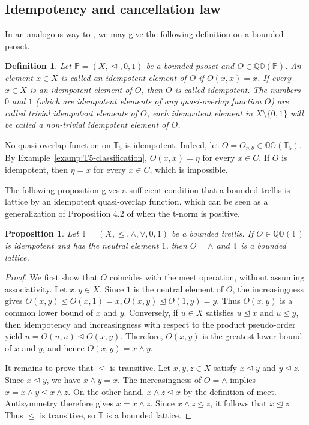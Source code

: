 \documentclass[preprint,12pt]{elsarticle}
\newtheorem{proposition}[theorem]{Proposition}
\newtheorem{definition}[theorem]{Definition}
\begin{document}
\subsection{Idempotency and cancellation law}

In an analogous way to \cite{Klement2000}, we may give the following definition on a bounded psoset.
\begin{definition}
\emph{Let $\mathbb{P}=(X,\trianglelefteq,0,1)$ be a bounded psoset and $O\in\mathbb{QO}(\mathbb{P})$. An element $x\in X$ is called an idempotent element of $O$ if $O(x,x)=x$. If every $x\in X$ is an idempotent element of $O$, then $O$ is called \emph{idempotent}. The numbers $0$ and $1$ (which are idempotent elements of any quasi-overlap function $O$) are called trivial idempotent elements of $O$, each idempotent element in $X\setminus \{0,1\}$ will be called a non-trivial idempotent element of $O$.}
\end{definition}

No quasi-overlap function on $\mathbb{T}_5$ is idempotent. Indeed,
let $O=O_{\eta,\theta}\in\mathbb{QO}(\mathbb{T}_5)$. By Example~\ref{examp:T5-classification},
$ O(x,x)=\eta \mbox{ for every }x\in C.$
If $O$ is idempotent, then $\eta=x$ for every $x\in C$, which is impossible.

The following proposition gives a sufficient condition that a bounded trellis is lattice by an idempotent quasi-overlap function, which can be seen as a generalization of Proposition 4.2 of \cite{Zedam2023} when the t-norm is positive.
\begin{proposition}\label{prop:idempotent-forces-lattice}
Let $\mathbb{T}=(X,\trianglelefteq,\wedge,\vee,0,1)$ be a bounded trellis. If $O\in\mathbb{QO}(\mathbb{T})$ is idempotent and has the neutral element $1$, then $O=\wedge$ and $\mathbb{T}$ is a bounded lattice.
\end{proposition}

\begin{proof}
We first show that $O$ coincides with the meet operation, without assuming associativity. Let $x,y\in X$. Since $1$ is the neutral element of $O$,  the increasingness gives
$
O(x,y)\trianglelefteq O(x,1)=x,
O(x,y)\trianglelefteq O(1,y)=y.
$
Thus $O(x,y)$ is a common lower bound of $x$ and $y$. Conversely, if $u\in X$ satisfies $u\trianglelefteq x$ and $u\trianglelefteq y$, then idempotency and increasingness with respect to the product pseudo-order yield
$
u=O(u,u)\trianglelefteq O(x,y).
$
Therefore, $O(x,y)$ is the greatest lower bound of $x$ and $y$, and hence $O(x,y)=x\wedge y$.

It remains to prove that $\trianglelefteq$ is transitive. Let $x,y,z\in X$ satisfy $x\trianglelefteq y$ and $y\trianglelefteq z$. Since $x\trianglelefteq y$, we have $x\wedge y=x$. The increasingness of $O=\wedge$ implies
$
x=x\wedge y\trianglelefteq x\wedge z.
$
On the other hand, $x\wedge z\trianglelefteq x$ by the definition of meet. Antisymmetry therefore gives $x=x\wedge z$. Since $x\wedge z\trianglelefteq z$, it follows that $x\trianglelefteq z$.
Thus $\trianglelefteq$ is transitive, so $\mathbb{T}$ is a bounded lattice.
\end{proof}
\end{document}
